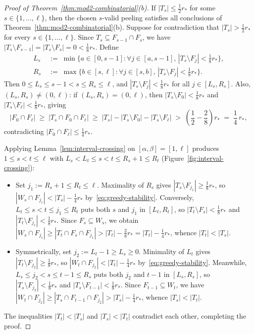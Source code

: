 \documentclass[11pt]{article}
\theoremstyle{definition}
\theoremstyle{remark}
\begin{document}
\begin{proof}[Proof of Theorem~\ref{thm:mod2-combinatorial}(b)]
If $|T_s| \le \frac{1}{2} r_*$ for some $s \in \{1, \dots, \ell\}$, then the chosen $s$-valid peeling satisfies all conclusions of Theorem~\ref{thm:mod2-combinatorial}(b). Suppose for contradiction that $|T_s| > \frac{1}{2} r_*$ for every $s \in \{1, \dots, \ell\}$. Since $T_s \subseteq F_{s-1} \cap F_s$, we have $|T_s \setminus F_{s-1}| = |T_s \setminus F_s| = 0 < \frac{1}{8} r_*$. Define
\begin{align*}
L_s &\;:=\; \min\bigl\{a \in [0, s - 1] : \forall j \in [a, s - 1],\, |T_s \setminus F_j| < \tfrac{1}{8} r_*\bigr\}, \\
R_s &\;:=\; \max\bigl\{b \in [s, \ell] : \forall j \in [s, b],\, |T_s \setminus F_j| < \tfrac{1}{8} r_*\bigr\}.
\end{align*}
Then $0 \le L_s \le s - 1 < s \le R_s \le \ell$, and $|T_s \setminus F_j| < \frac{1}{8} r_*$ for all $j \in [L_s, R_s]$. Also, $(L_s, R_s) \ne (0, \ell)$: if $(L_s, R_s) = (0, \ell)$, then $|T_s \setminus F_0| < \frac{1}{8} r_*$ and $|T_s \setminus F_\ell| < \frac{1}{8} r_*$, giving
\[
|F_0 \cap F_\ell| \;\ge\; |T_s \cap F_0 \cap F_\ell| \;\ge\; |T_s| - |T_s \setminus F_0| - |T_s \setminus F_\ell| \;>\; \left(\frac{1}{2} - \frac{2}{8}\right) r_* \;=\; \frac{1}{4}\,r_*,
\]
contradicting $|F_0 \cap F_\ell| \le \frac{1}{4} r_*$.

Applying Lemma~\ref{lem:interval-crossing} on $[\alpha, \beta] = [1, \ell]$ produces $1 \le s < t \le \ell$ with $L_s < L_t \le s < t \le R_s + 1 \le R_t$ (Figure~\ref{fig:interval-crossing}):
\begin{itemize}[leftmargin=2em,nosep]
  \item Set $j_1 := R_s + 1 \le R_t \le \ell$. Maximality of $R_s$ gives $|T_s \setminus F_{j_1}| \ge \frac{1}{8} r_*$, so $|W_s \cap F_{j_1}| < |T_s| - \frac{1}{4} r_*$ by~\eqref{eq:greedy-stability}. Conversely, $L_t \le s < t \le j_1 \le R_t$ puts both $s$ and $j_1$ in $[L_t, R_t]$, so $|T_t \setminus F_s| < \frac{1}{8} r_*$ and $|T_t \setminus F_{j_1}| < \frac{1}{8} r_*$. Since $F_s \subseteq W_s$, we obtain $|W_s \cap F_{j_1}| \ge |T_t \cap F_s \cap F_{j_1}| > |T_t| - \frac{2}{8} r_* = |T_t| - \frac{1}{4} r_*$, whence $|T_t| < |T_s|$.
  \item Symmetrically, set $j_2 := L_t - 1 \ge L_s \ge 0$. Minimality of $L_t$ gives $|T_t \setminus F_{j_2}| \ge \frac{1}{8} r_*$, so $|W_t \cap F_{j_2}| < |T_t| - \frac{1}{4} r_*$ by~\eqref{eq:greedy-stability}. Meanwhile, $L_s \le j_2 < s \le t - 1 \le R_s$ puts both $j_2$ and $t - 1$ in $[L_s, R_s]$, so $|T_s \setminus F_{j_2}| < \frac{1}{8} r_*$ and $|T_s \setminus F_{t-1}| < \frac{1}{8} r_*$. Since $F_{t-1} \subseteq W_t$, we have $|W_t \cap F_{j_2}| \ge |T_s \cap F_{t-1} \cap F_{j_2}| > |T_s| - \frac{1}{4} r_*$, whence $|T_s| < |T_t|$.
\end{itemize}
The inequalities $|T_t| < |T_s|$ and $|T_s| < |T_t|$ contradict each other, completing the proof.
\end{proof}
\end{document}
